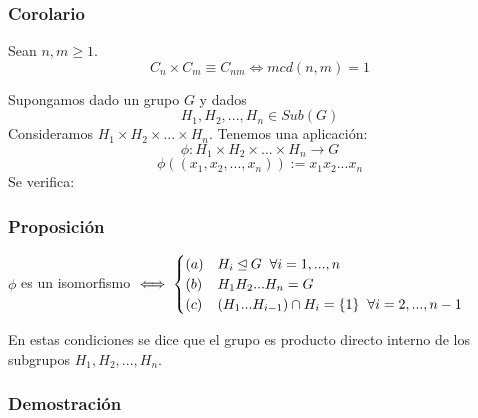 \documentclass[11pt,a4paper]{article}
\begin{document}
\subsubsection*{Corolario}

Sean $n, m \geq 1$.
$$C_{n} \times C_{m} \equiv C_{nm} \iff mcd(n, m) = 1$$

Supongamos dado un grupo $G$ y dados
$$H_{1}, H_{2}, ..., H_{n} \in Sub(G)$$
Consideramos $H_{1} \times H_{2} \times ... \times H_{n}$. Tenemos una aplicación:
$$\phi: H_{1} \times H_{2} \times ... \times H_{n} \to G$$
$$\phi((x_{1}, x_{2}, ..., x_{n})) := x_{1}x_{2}...x_{n}$$
Se verifica:

\subsubsection*{Proposición}

$\phi$ es un isomorfismo $\iff
\begin{cases}
(a) & H_{i} \unlhd G \hspace{0.2cm} \forall i = 1, ..., n \\
(b) & H_{1}H_{2}...H_{n} = G \\
(c) & (H_{1}...H_{i-1}) \cap H_{i} = \{1\} \hspace{0.2cm} \forall i = 2, ..., n-1
\end{cases}$

En estas condiciones se dice que el grupo es producto directo interno de los subgrupos $H_{1}, H_{2}, ..., H_{n}$.

\subsubsection*{Demostración}
\end{document}
